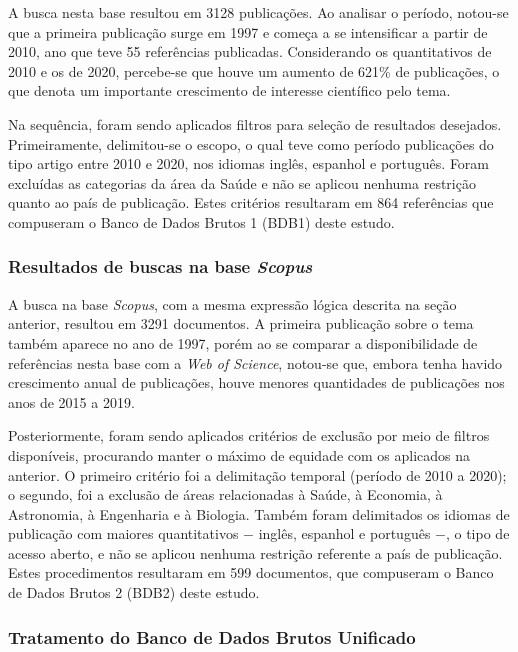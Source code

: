 \documentclass[portuguese]{textolivre}
\begin{document}
A busca nesta base resultou em 3128 publicações. Ao analisar o período, notou-se que a primeira publicação surge em 1997 e começa a se intensificar a partir de 2010, ano que teve 55 referências publicadas. Considerando os quantitativos de 2010 e os de 2020, percebe-se que houve um aumento de 621\% de publicações, o que denota um importante crescimento de interesse científico pelo tema.

Na sequência, foram sendo aplicados filtros para seleção de resultados desejados. Primeiramente, delimitou-se o escopo, o qual teve como período publicações do tipo artigo entre 2010 e 2020, nos idiomas inglês, espanhol e português. Foram excluídas as categorias da área da Saúde e não se aplicou nenhuma restrição quanto ao país de publicação. Estes critérios resultaram em 864 referências que compuseram o Banco de Dados Brutos 1 (BDB1) deste estudo.

\subsubsection{Resultados de buscas na base \textit{Scopus}}

A busca na base \textit{Scopus}, com a mesma expressão lógica descrita na seção anterior, resultou em 3291 documentos. A primeira publicação sobre o tema também aparece no ano de 1997, porém ao se comparar a disponibilidade de referências nesta base com a \textit{Web of Science}, notou-se que, embora tenha havido crescimento anual de publicações, houve menores quantidades de publicações nos anos de 2015 a 2019.

Posteriormente, foram sendo aplicados critérios de exclusão por meio de filtros disponíveis, procurando manter o máximo de equidade com os aplicados na anterior. O primeiro critério foi a delimitação temporal (período de 2010 a 2020); o segundo, foi a exclusão de áreas relacionadas à Saúde, à Economia, à Astronomia, à Engenharia e à Biologia. Também foram delimitados os idiomas de publicação com maiores quantitativos − inglês, espanhol e português −, o tipo de acesso aberto, e não se aplicou nenhuma restrição referente a país de publicação. Estes procedimentos resultaram em 599 documentos, que compuseram o Banco de Dados Brutos 2 (BDB2) deste estudo.

\subsubsection{Tratamento do Banco de Dados Brutos Unificado}
\end{document}

